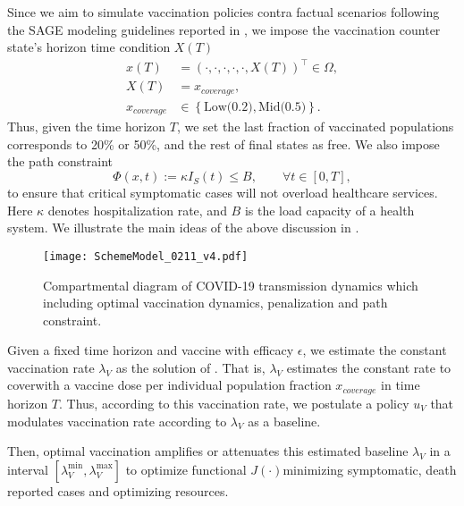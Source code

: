 Since we aim to simulate vaccination policies contra factual scenarios
following the SAGE modeling guidelines reported in \cite{sage2020},
we impose the vaccination counter state's horizon time condition $X(T)$
\begin{equation}
    \label{eqn:coverage_constrain}
    \begin{aligned}
        x(T) &=
        (\cdot, \cdot, \cdot, \cdot, \cdot, X(T))^{\top}
        \in \Omega,
        \\
        X(T)
        &= x_{cover age},
        \\
        x_{coverage}
        & \in
        \left \{
        \text{Low(0.2)},\text{Mid(0.5)}
        \right \} .
    \end{aligned}
\end{equation}
Thus, given the time horizon $T$, we set the last fraction of
vaccinated populations corresponds to 20\% or 50\%, and the rest of
final states as free. We also impose the path constraint
\begin{equation}
    \label{eqn:path_constrain}
    \Phi(x,t):= \kappa I_S(t) \leq B,
    \qquad \forall t \in [0, T],
\end{equation}
to ensure that critical symptomatic cases
will not overload healthcare services. Here $\kappa$
denotes hospitalization rate, and $B$ is the load capacity of a
health system. We illustrate the main ideas of the above discussion
in .
\begin{figure}[h!]
    \centering
    \texttt{[image: SchemeModel\_0211\_v4.pdf]}
    \caption{Compartmental diagram of COVID-19 transmission dynamics which
        including optimal vaccination dynamics, penalization and path
        constraint.}
    \label{Fig:SchemeModel_opt}
\end{figure}

Given a fixed time horizon and vaccine with efficacy $\epsilon$,
we estimate the constant vaccination rate $\lambda_V$ as the solution of
.
That is, $\lambda_V$ estimates the constant rate
to cover\textemdash with a vaccine dose per individual\textemdash
population fraction $x_{coverage}$ in time horizon $T$.
Thus, according to this vaccination rate, we postulate a policy $u_V$ that
modulates vaccination rate according to $\lambda_V$ as a baseline.

Then, optimal vaccination amplifies or attenuates this estimated baseline
$\lambda_V$ in a interval $[\lambda_V^{\min}, \lambda_V^{\max}]$
to optimize functional $J(\cdot)$\textemdash minimizing
symptomatic, death reported cases and optimizing resources.

